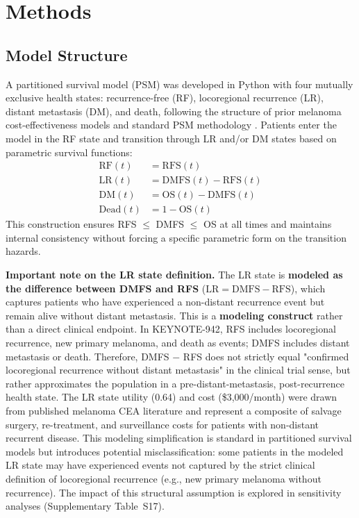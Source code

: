 \documentclass[12pt,a4paper]{article}
\begin{document}
\section{Methods}

\subsection{Model Structure}

A partitioned survival model (PSM) was developed in Python with four mutually exclusive health states: recurrence-free (RF), locoregional recurrence (LR), distant metastasis (DM), and death, following the structure of prior melanoma cost-effectiveness models and standard PSM methodology \cite{woods2017,zhang2023,bensimon2019,gye2024}. Patients enter the model in the RF state and transition through LR and/or DM states based on parametric survival functions:
\begin{align*}
\text{RF}(t) &= \text{RFS}(t) \\
\text{LR}(t) &= \text{DMFS}(t) - \text{RFS}(t) \\
\text{DM}(t) &= \text{OS}(t) - \text{DMFS}(t) \\
\text{Dead}(t) &= 1 - \text{OS}(t)
\end{align*}
This construction ensures RFS $\leq$ DMFS $\leq$ OS at all times and maintains internal consistency without forcing a specific parametric form on the transition hazards.

\textbf{Important note on the LR state definition.} \label{sec:lr_definition}
The LR state is \textbf{modeled as the difference between DMFS and RFS} ($\text{LR} = \text{DMFS} - \text{RFS}$), which captures patients who have experienced a non-distant recurrence event but remain alive without distant metastasis. This is a \textbf{modeling construct} rather than a direct clinical endpoint. In KEYNOTE-942, RFS includes locoregional recurrence, new primary melanoma, and death as events; DMFS includes distant metastasis or death. Therefore, DMFS $-$ RFS does not strictly equal "confirmed locoregional recurrence without distant metastasis" in the clinical trial sense, but rather approximates the population in a pre-distant-metastasis, post-recurrence health state. The LR state utility (0.64) and cost (\$3,000/month) were drawn from published melanoma CEA literature \cite{bensimon2019,zhang2023} and represent a composite of salvage surgery, re-treatment, and surveillance costs for patients with non-distant recurrent disease. This modeling simplification is standard in partitioned survival models but introduces potential misclassification: some patients in the modeled LR state may have experienced events not captured by the strict clinical definition of locoregional recurrence (e.g., new primary melanoma without recurrence). The impact of this structural assumption is explored in sensitivity analyses (Supplementary Table~S17).
\end{document}
